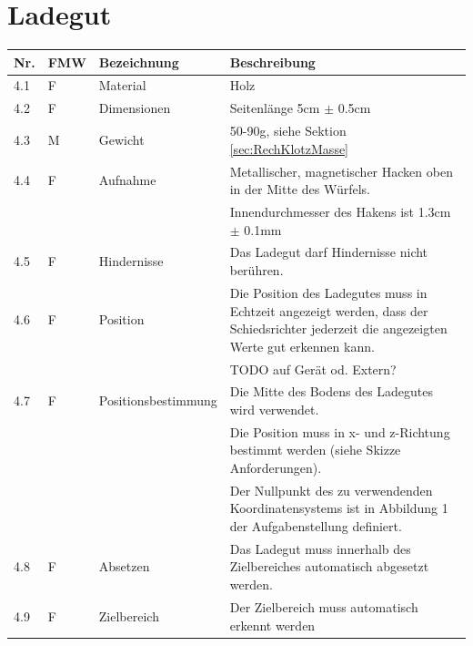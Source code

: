 \documentclass[a4paper]{report}
\begin{document}
\section{Ladegut}
\label{sec:AnfLadegut}
\begin{tabular}{|p{}|p{}|p{}|p{}|}
	\hline
	\textbf{Nr.} & \textbf{FMW\footnotemark} & \textbf{Bezeichnung} & \textbf{Beschreibung} \\
	\hline
	4.1 & F & Material & Holz \\
	\hline
	4.2 & F &  Dimensionen & Seitenlänge 5cm $\pm$ 0.5cm \\
	\hline
	4.3 & M & Gewicht & 50-90g, siehe Sektion \ref{sec:RechKlotzMasse} \\
	\hline
	4.4 & F & Aufnahme & Metallischer, magnetischer Hacken oben in der Mitte des Würfels.\\
	& & & Innendurchmesser des Hakens ist 1.3cm $\pm$ 0.1mm\\
	\hline
	4.5 & F & Hindernisse & Das Ladegut darf Hindernisse nicht berühren. \\
	\hline
	4.6 & F & Position & Die Position des Ladegutes muss in Echtzeit angezeigt werden, dass der Schiedsrichter jederzeit die angezeigten Werte gut erkennen kann.\\
	& & & TODO auf Gerät od. Extern? \\
	\hline
	4.7 & F & Positionsbestimmung & Die Mitte des Bodens des Ladegutes wird verwendet.\\
	& & & Die Position muss in x- und z-Richtung bestimmt werden (siehe Skizze Anforderungen).\\
	& & & Der Nullpunkt des zu verwendenden Koordinatensystems ist in Abbildung 1 der Aufgabenstellung definiert. \\
	\hline
	4.8 & F & Absetzen & Das Ladegut muss innerhalb des Zielbereiches automatisch abgesetzt werden. \\
	\hline
	4.9 & F & Zielbereich & Der Zielbereich muss automatisch erkennt werden\\
	\hline
\end{tabular}
\end{document}
